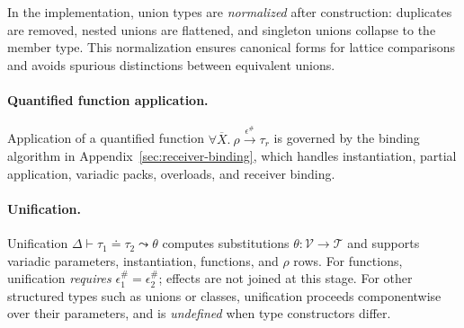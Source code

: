In the implementation, union types are \emph{normalized} after construction: duplicates are removed, nested unions are flattened, and singleton unions collapse to the member type.  
This normalization ensures canonical forms for lattice comparisons and avoids spurious distinctions between equivalent unions.

\paragraph{Quantified function application.}
Application of a quantified function $\forall\overline{X}.~\rho \xrightarrow{\epsilon^\#} \tau_r$
is governed by the binding algorithm in Appendix~\ref{sec:receiver-binding},
which handles instantiation, partial application, variadic packs, overloads, and receiver binding.
\paragraph{Unification.}  
Unification $\Delta \vdash \tau_1 \doteq \tau_2 \leadsto \theta$ computes substitutions $\theta : \mathcal{V} \to \mathcal{T}$ and supports variadic parameters, instantiation, functions, and $\rho$ rows.  
For functions, unification \emph{requires} $\epsilon^\#_1 = \epsilon^\#_2$; effects are not joined at this stage.  
For other structured types such as unions or classes, unification proceeds componentwise over their parameters, and is \emph{undefined} when type constructors differ.

